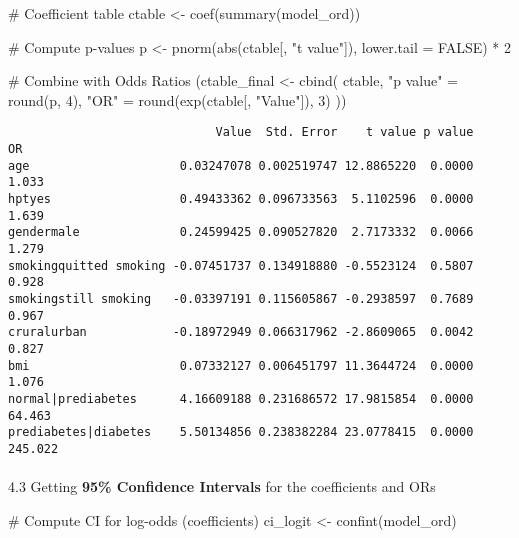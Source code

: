 \documentclass[
  letterpaper,
  DIV=11,
  numbers=noendperiod]{scrartcl}
\makeatletter
\let\oldparagraph\paragraph
\renewcommand{\paragraph}{
    \@ifstar
      \xxxParagraphStar
      \xxxParagraphNoStar
  }
\newcommand{\xxxParagraphStar}[1]{\oldparagraph*{#1}\mbox{}}
\newcommand{\xxxParagraphNoStar}[1]{\oldparagraph{#1}\mbox{}}
\newenvironment{Shaded}{\begin{snugshade}}{\end{snugshade}}
\newcommand{\AttributeTok}[1]{\textcolor[rgb]{0.40,0.45,0.13}{#1}}
\newcommand{\CommentTok}[1]{\textcolor[rgb]{0.37,0.37,0.37}{#1}}
\newcommand{\ConstantTok}[1]{\textcolor[rgb]{0.56,0.35,0.01}{#1}}
\newcommand{\DecValTok}[1]{\textcolor[rgb]{0.68,0.00,0.00}{#1}}
\newcommand{\FunctionTok}[1]{\textcolor[rgb]{0.28,0.35,0.67}{#1}}
\newcommand{\NormalTok}[1]{\textcolor[rgb]{0.00,0.23,0.31}{#1}}
\newcommand{\OtherTok}[1]{\textcolor[rgb]{0.00,0.23,0.31}{#1}}
\newcommand{\SpecialCharTok}[1]{\textcolor[rgb]{0.37,0.37,0.37}{#1}}
\newcommand{\StringTok}[1]{\textcolor[rgb]{0.13,0.47,0.30}{#1}}
\makeatother
\begin{document}
\begin{Shaded}
\begin{Highlighting}[]
\CommentTok{\#  Coefficient table}
\NormalTok{ctable }\OtherTok{\textless{}{-}} \FunctionTok{coef}\NormalTok{(}\FunctionTok{summary}\NormalTok{(model\_ord))}

\CommentTok{\#  Compute p{-}values}
\NormalTok{p }\OtherTok{\textless{}{-}} \FunctionTok{pnorm}\NormalTok{(}\FunctionTok{abs}\NormalTok{(ctable[, }\StringTok{"t value"}\NormalTok{]), }\AttributeTok{lower.tail =} \ConstantTok{FALSE}\NormalTok{) }\SpecialCharTok{*} \DecValTok{2}

\CommentTok{\#  Combine with Odds Ratios}
\NormalTok{(ctable\_final }\OtherTok{\textless{}{-}} \FunctionTok{cbind}\NormalTok{(}
\NormalTok{  ctable,}
  \StringTok{"p value"} \OtherTok{=} \FunctionTok{round}\NormalTok{(p, }\DecValTok{4}\NormalTok{),}
  \StringTok{"OR"} \OtherTok{=} \FunctionTok{round}\NormalTok{(}\FunctionTok{exp}\NormalTok{(ctable[, }\StringTok{"Value"}\NormalTok{]), }\DecValTok{3}\NormalTok{)}
\NormalTok{))}
\end{Highlighting}
\end{Shaded}

\begin{verbatim}
                             Value  Std. Error    t value p value      OR
age                     0.03247078 0.002519747 12.8865220  0.0000   1.033
hptyes                  0.49433362 0.096733563  5.1102596  0.0000   1.639
gendermale              0.24599425 0.090527820  2.7173332  0.0066   1.279
smokingquitted smoking -0.07451737 0.134918880 -0.5523124  0.5807   0.928
smokingstill smoking   -0.03397191 0.115605867 -0.2938597  0.7689   0.967
cruralurban            -0.18972949 0.066317962 -2.8609065  0.0042   0.827
bmi                     0.07332127 0.006451797 11.3644724  0.0000   1.076
normal|prediabetes      4.16609188 0.231686572 17.9815854  0.0000  64.463
prediabetes|diabetes    5.50134856 0.238382284 23.0778415  0.0000 245.022
\end{verbatim}

\paragraph{\texorpdfstring{4.3 Getting \textbf{95\% Confidence
Intervals} for the coefficients and
ORs}{4.3 Getting 95\% Confidence Intervals for the coefficients and ORs}}\label{getting-95-confidence-intervals-for-the-coefficients-and-ors}

\begin{Shaded}
\begin{Highlighting}[]
\CommentTok{\#  Compute CI for log{-}odds (coefficients)}
\NormalTok{ci\_logit }\OtherTok{\textless{}{-}} \FunctionTok{confint}\NormalTok{(model\_ord)}
\end{Highlighting}
\end{Shaded}
\end{document}
